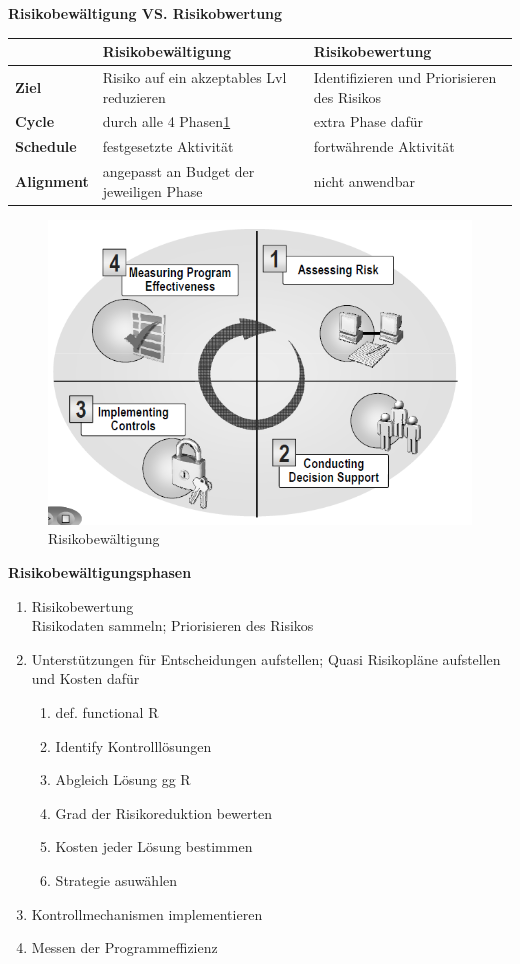 \textbf{Risikobewältigung VS. Risikobwertung}
\begin{table}[!h]
	\begin{tabular}{|l|l|l|}
		\hline
				& \textbf{Risikobewältigung}	& \textbf{Risikobewertung}\\
		\hline
		\textbf{Ziel}	& Risiko auf ein akzeptables Lvl reduzieren & Identifizieren und Priorisieren des Risikos\\
		\hline
		\textbf{Cycle} 	& durch alle 4 Phasen\ref{risk_management}	& extra Phase dafür\\
		\hline
		\textbf{Schedule} & festgesetzte Aktivität & fortwährende Aktivität\\
		\hline
		\textbf{Alignment} & angepasst an Budget der jeweiligen Phase & nicht anwendbar \\
		\hline
	\end{tabular}
\end{table}
\begin{figure}[!h]
	\centering
	\includegraphics[scale=0.7]{img/risk_management.png}
	\caption{Risikobewältigung}
	\label{risk_management}
\end{figure}
\textbf{Risikobewältigungsphasen}
\begin{enumerate}
	\item Risikobewertung\\
	Risikodaten sammeln; Priorisieren des Risikos
	\item Unterstützungen für Entscheidungen aufstellen; Quasi Risikopläne aufstellen und Kosten dafür
	\begin{enumerate}
		\item def. functional R
		\item Identify Kontrolllösungen
		\item Abgleich Lösung gg R
		\item Grad der Risikoreduktion bewerten
		\item Kosten jeder Lösung bestimmen
		\item Strategie asuwählen
	\end{enumerate}
	\item Kontrollmechanismen implementieren
	\item Messen der Programmeffizienz
\end{enumerate}

